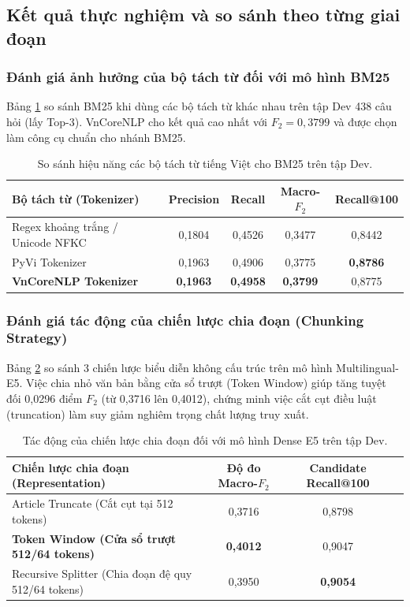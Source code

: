 \documentclass[12pt,a4paper]{article}
\begin{document}
\subsection{Kết quả thực nghiệm và so sánh theo từng giai đoạn}

\subsubsection{Đánh giá ảnh hưởng của bộ tách từ đối với mô hình BM25}
Bảng \ref{tab:bm25_results} so sánh BM25 khi dùng các bộ tách từ khác nhau trên tập Dev 438 câu hỏi (lấy Top-3). VnCoreNLP cho kết quả cao nhất với $F_2 = 0,3799$ và được chọn làm công cụ chuẩn cho nhánh BM25.

\begin{table}[htbp]
\centering
\caption{So sánh hiệu năng các bộ tách từ tiếng Việt cho BM25 trên tập Dev.}
\label{tab:bm25_results}
\footnotesize
\begin{tabularx}{\textwidth}{X c c c c}
\toprule
\textbf{Bộ tách từ (Tokenizer)} & \textbf{Precision} & \textbf{Recall} & \textbf{Macro-$F_2$} & \textbf{Recall@100} \\
\midrule
Regex khoảng trắng / Unicode NFKC & 0,1804 & 0,4526 & 0,3477 & 0,8442 \\
PyVi Tokenizer & 0,1963 & 0,4906 & 0,3775 & \textbf{0,8786} \\
\textbf{VnCoreNLP Tokenizer} & \textbf{0,1963} & \textbf{0,4958} & \textbf{0,3799} & 0,8775 \\
\bottomrule
\end{tabularx}
\end{table}

\subsubsection{Đánh giá tác động của chiến lược chia đoạn (Chunking Strategy)}
Bảng \ref{tab:chunking_results} so sánh 3 chiến lược biểu diễn không cấu trúc trên mô hình Multilingual-E5. Việc chia nhỏ văn bản bằng cửa sổ trượt (Token Window) giúp tăng tuyệt đối 0,0296 điểm $F_2$ (từ 0,3716 lên 0,4012), chứng minh việc cắt cụt điều luật (truncation) làm suy giảm nghiêm trọng chất lượng truy xuất.

\begin{table}[htbp]
\centering
\caption{Tác động của chiến lược chia đoạn đối với mô hình Dense E5 trên tập Dev.}
\label{tab:chunking_results}
\footnotesize
\begin{tabularx}{\textwidth}{X c c c}
\toprule
\textbf{Chiến lược chia đoạn (Representation)} & \textbf{Độ đo Macro-$F_2$} & \textbf{Candidate Recall@100} \\
\midrule
Article Truncate (Cắt cụt tại 512 tokens) & 0,3716 & 0,8798 \\
\textbf{Token Window (Cửa sổ trượt 512/64 tokens)} & \textbf{0,4012} & 0,9047 \\
Recursive Splitter (Chia đoạn đệ quy 512/64 tokens) & 0,3950 & \textbf{0,9054} \\
\bottomrule
\end{tabularx}
\end{table}
\end{document}
